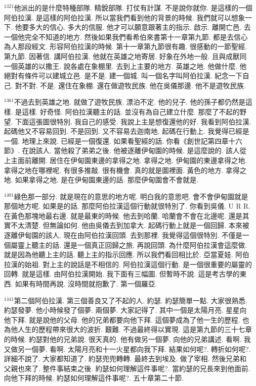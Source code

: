 \documentclass{book}
\begin{document}
$^{1321}$他派出的是什麼特種部隊.
精銳部隊.
打仗有計謀.
不是說你就你.
是這樣的一個阿伯拉漢.
是這樣的阿伯拉漢.
所以當我們看到他的背景的時候.
我們就可以想象一下.
他要多大的信心.
多大的信服.
他才可以願意跟著主的指示.
啟示.
離開亡邑.
去一個他完全不知道的地方.
然後如果我們看希伯來書第十一章第九節.
都是去信心為人那段經文.
形容阿伯拉漢的時候.
第十一章第九節很有趣.
很感動的一節聖經.
第九節.
因著信.
講阿伯拉漢.
他就在英雄之地寄居.
好象在外地一般.
且與成獸同一個英雄的以撒王.
說各處在象棚里.
去到上主要的地方.
英雄之地.
他做什麼.
他絕對有條件可以建城立邑.
是不是.
建一個城.
叫一個名字叫阿伯拉漢.
紀念一下自己.
對不對.
不是.
還住在象棚.
還在做遊牧民族.
他在吳儀那邊.
他不是遊牧民族.

$^{1361}$不過去到英雄之地.
就做了遊牧民族.
漂泊不定.
他的兒子.
他的孫子都仍然是這樣.
是這樣.
好奇怪.
阿伯拉漢聽主的話.
並沒有為自己建立什麼.
那麼了不起的野望.
下面這張圖很特別.
我自己的感受.
我說上主是想復還他的好.
我看到阿伯拉漢.
起碼他又不容易回到.
不是回到.
又不容易去迦南地.
起碼在行動上.
我覺得已經是一個.
地理上來說.
已經是一個復還.
如果看聖經的話.
你看《創世記第四章十六節》.
在說該人.
當他殺了弟弟之後.
他被逐離伊甸園的時候.
是這麼說的.
該人從上主面前離開.
居住在伊甸園東邊的拿得之地.
拿得之地.
伊甸園的東邊拿得之地.
拿得之地在哪裡呢.
有很多推敲.
很有機會.
真的就是圖裡面.
黃色的地方.
拿得之地.
如果拿得之地.
是在伊甸園東邊的話.
那麼伊甸園會不會就是.

$^{1401}$綠色那一部分.
就是現在的意思的地方呢.
明白我的意思吧.
會不會伊甸園就是那個地方呢.
如果是的話.
那麼阿伯拉漢這個行動就很特別了.
你看到吳儀.
U R R.
在黃色那塊地最右邊.
就是最東的時候.
他去到哈蘭.
哈蘭會不會在北邊呢.
還是其實不太清楚.
但無論如何.
他由吳儀去到加拿大.
起碼行動上就是一個回歸.
本來被逐離伊甸園的該人.
現在由阿伯拉漢回頭.
去到那裡.
我覺得這個很特別.
不僅是一個屬靈上聽主的話.
還是一個真正回歸之旅.
再說回頭.
為什麼阿伯拉漢會這麼做.
就是因為他聽上主的話.
聽上主的指示回應.
所以我們看回相比於.
亞當夏娃.
阿伯拉漢的始祖.
對上主的說話是不相信的.
阿伯拉漢這個行動.
是一個很重要的屬靈的回轉.
就是這樣.
由阿伯拉漢開始.
我下面有三幅圖.
但暫時不說.
這是考古學的東西.
如果有時間再說.
沒時間就抱歉了.
第一個羅亞.

$^{1441}$第二個阿伯拉漢.
第三個善良又了不起的人.
約瑟.
約瑟簡單一點.
大家很熟悉.
約瑟發夢.
他小時候發了個夢.
兩個夢.
大家記得了.
其中一個是太陽月亮.
星星向他下拜.
就是說他的父母.
他的兄弟都要向他下拜.
這個夢成為了他一生的歷程.
也為他人生的歷程帶來很大的波折.
艱難.
不過最終得以實現.
這是第九節的三十七章的時候.
約瑟對他的兄弟說.
很天真的.
他有做另一個夢.
向他的兄弟講述.
看啊.
我又做另一個夢.
看啊.
太陽月亮和十一火星都向我下拜.
結果如何呢?.
轉折如何呢?.
詳細不說了.
大家都知道了.
約瑟兜兜轉轉.
最終去到埃及.
做了宰相.
然後兄弟和父親也來了.
整件事結束之後.
約瑟如何理解這件事呢?.
當約瑟的兄長來到他面前.
向他下拜的時候.
約瑟如何理解這件事呢?.
五十章第二十節.
\end{document}
